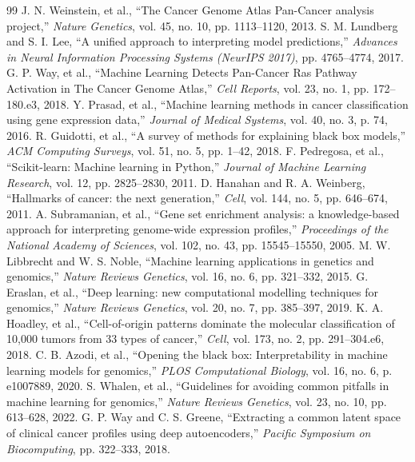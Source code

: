 \documentclass[journal,10pt]{IEEEtran}
\begin{document}
\begin{thebibliography}{99}
 J. N. Weinstein, et al., ``The Cancer Genome Atlas Pan-Cancer analysis project,'' \textit{Nature Genetics}, vol. 45, no. 10, pp. 1113--1120, 2013.
 S. M. Lundberg and S. I. Lee, ``A unified approach to interpreting model predictions,'' \textit{Advances in Neural Information Processing Systems (NeurIPS 2017)}, pp. 4765--4774, 2017.
 G. P. Way, et al., ``Machine Learning Detects Pan-Cancer Ras Pathway Activation in The Cancer Genome Atlas,'' \textit{Cell Reports}, vol. 23, no. 1, pp. 172--180.e3, 2018.
 Y. Prasad, et al., ``Machine learning methods in cancer classification using gene expression data,'' \textit{Journal of Medical Systems}, vol. 40, no. 3, p. 74, 2016.
 R. Guidotti, et al., ``A survey of methods for explaining black box models,'' \textit{ACM Computing Surveys}, vol. 51, no. 5, pp. 1--42, 2018.
 F. Pedregosa, et al., ``Scikit-learn: Machine learning in Python,'' \textit{Journal of Machine Learning Research}, vol. 12, pp. 2825--2830, 2011.
 D. Hanahan and R. A. Weinberg, ``Hallmarks of cancer: the next generation,'' \textit{Cell}, vol. 144, no. 5, pp. 646--674, 2011.
 A. Subramanian, et al., ``Gene set enrichment analysis: a knowledge-based approach for interpreting genome-wide expression profiles,'' \textit{Proceedings of the National Academy of Sciences}, vol. 102, no. 43, pp. 15545--15550, 2005.
 M. W. Libbrecht and W. S. Noble, ``Machine learning applications in genetics and genomics,'' \textit{Nature Reviews Genetics}, vol. 16, no. 6, pp. 321--332, 2015.
 G. Eraslan, et al., ``Deep learning: new computational modelling techniques for genomics,'' \textit{Nature Reviews Genetics}, vol. 20, no. 7, pp. 385--397, 2019.
 K. A. Hoadley, et al., ``Cell-of-origin patterns dominate the molecular classification of 10,000 tumors from 33 types of cancer,'' \textit{Cell}, vol. 173, no. 2, pp. 291--304.e6, 2018.
 C. B. Azodi, et al., ``Opening the black box: Interpretability in machine learning models for genomics,'' \textit{PLOS Computational Biology}, vol. 16, no. 6, p. e1007889, 2020.
 S. Whalen, et al., ``Guidelines for avoiding common pitfalls in machine learning for genomics,'' \textit{Nature Reviews Genetics}, vol. 23, no. 10, pp. 613--628, 2022.
 G. P. Way and C. S. Greene, ``Extracting a common latent space of clinical cancer profiles using deep autoencoders,'' \textit{Pacific Symposium on Biocomputing}, pp. 322--333, 2018.

\end{thebibliography}
\end{document}
